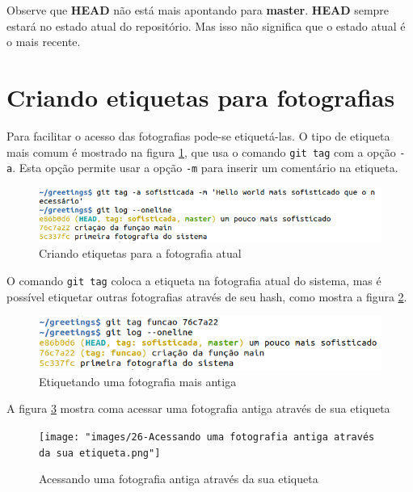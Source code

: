 \documentclass[a4paper]{book}
\begin{document}
Observe que \textbf{HEAD} não está mais apontando para 
\textbf{master}. \textbf{HEAD} sempre estará no estado 
atual do repositório. Mas isso não significa que o estado 
atual é o mais recente.

\section{Criando etiquetas para fotografias}

Para facilitar o acesso das fotografias pode-se etiquetá-las.
O tipo de etiqueta mais comum é mostrado na figura
\ref{fig:23}, que usa o comando \texttt{git tag} com a
opção \texttt{-a}. Esta opção permite usar a opção 
\texttt{-m} para inserir um comentário na etiqueta.

\begin{figure}[ht]
\caption{Criando etiquetas para a fotografia atual}
\label{fig:23}
\centering
\includegraphics[scale=0.6,left]{"images/23-Criando etiquetas para a fotografia atual.png"}
\end{figure}

O comando \texttt{git tag} coloca a etiqueta na fotografia atual
do sistema, mas é possível etiquetar outras fotografias 
através de seu hash, como mostra a figura \ref{fig:25}.

\begin{figure}[!h]
\caption{Etiquetando uma fotografia mais antiga}
\label{fig:25}
\centering
\includegraphics[scale=0.6,left]{"images/25-Etiquetando uma fotografia mais antiga.png"}
\end{figure}

A figura \ref{fig:26} mostra coma acessar uma fotografia antiga 
através de sua etiqueta

\begin{figure}[!h]
\caption{Acessando uma fotografia antiga através da sua etiqueta}
\label{fig:26}
\centering
\texttt{[image: "images/26-Acessando uma fotografia antiga através da sua etiqueta.png"]}
\end{figure}
\end{document}
